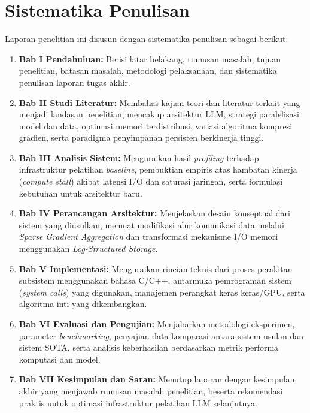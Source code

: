 \section{Sistematika Penulisan}

Laporan penelitian ini disusun dengan sistematika penulisan sebagai berikut:
\begin{enumerate}
    \item \textbf{Bab I Pendahuluan:} Berisi latar belakang, rumusan masalah, tujuan penelitian, batasan masalah, metodologi pelaksanaan, dan sistematika penulisan laporan tugas akhir.
    \item \textbf{Bab II Studi Literatur:} Membahas kajian teori dan literatur terkait yang menjadi landasan penelitian, mencakup arsitektur LLM, strategi paralelisasi model dan data, optimasi memori terdistribusi, variasi algoritma kompresi gradien, serta paradigma penyimpanan persisten berkinerja tinggi.
    \item \textbf{Bab III Analisis Sistem:} Menguraikan hasil \textit{profiling} terhadap infrastruktur pelatihan \textit{baseline}, pembuktian empiris atas hambatan kinerja (\textit{compute stall}) akibat latensi I/O dan saturasi jaringan, serta formulasi kebutuhan untuk arsitektur baru.
    \item \textbf{Bab IV Perancangan Arsitektur:} Menjelaskan desain konseptual dari sistem yang diusulkan, memuat modifikasi alur komunikasi data melalui \textit{Sparse Gradient Aggregation} dan transformasi mekanisme I/O memori menggunakan \textit{Log-Structured Storage}.
    \item \textbf{Bab V Implementasi:} Menguraikan rincian teknis dari proses perakitan subsistem menggunakan bahasa C/C++, antarmuka pemrograman sistem (\textit{system calls}) yang digunakan, manajemen perangkat keras keras/GPU, serta algoritma inti yang dikembangkan.
    \item \textbf{Bab VI Evaluasi dan Pengujian:} Menjabarkan metodologi eksperimen, parameter \textit{benchmarking}, penyajian data komparasi antara sistem usulan dan sistem SOTA, serta analisis keberhasilan berdasarkan metrik performa komputasi dan model.
    \item \textbf{Bab VII Kesimpulan dan Saran:} Menutup laporan dengan kesimpulan akhir yang menjawab rumusan masalah penelitian, beserta rekomendasi praktis untuk optimasi infrastruktur pelatihan LLM selanjutnya.
\end{enumerate}